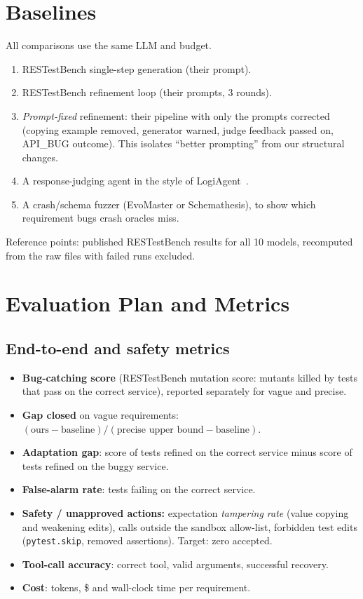 \documentclass[11pt,a4paper]{article}
\begin{document}
\section{Baselines}
All comparisons use the same LLM and budget.
\begin{enumerate}[label=B\arabic*.]
  \item RESTestBench single-step generation (their prompt).
  \item RESTestBench refinement loop (their prompts, 3 rounds).
  \item \emph{Prompt-fixed} refinement: their pipeline with only the prompts corrected (copying example removed, generator warned, judge feedback passed on, \textsc{API\_BUG} outcome). This isolates ``better prompting'' from our structural changes.
  \item A response-judging agent in the style of LogiAgent~\cite{logiagent}.
  \item A crash/schema fuzzer (EvoMaster or Schemathesis), to show which requirement bugs crash oracles miss.
\end{enumerate}
Reference points: published RESTestBench results for all 10 models, recomputed from the raw files with failed runs excluded.

\section{Evaluation Plan and Metrics}
\subsection{End-to-end and safety metrics}
\begin{itemize}
  \item \textbf{Bug-catching score} (RESTestBench mutation score: mutants killed by tests that pass on the correct service), reported separately for vague and precise.
  \item \textbf{Gap closed} on vague requirements: $(\text{ours} - \text{baseline}) / (\text{precise upper bound} - \text{baseline})$.
  \item \textbf{Adaptation gap}: score of tests refined on the correct service minus score of tests refined on the buggy service.
  \item \textbf{False-alarm rate}: tests failing on the correct service.
  \item \textbf{Safety / unapproved actions:} expectation \emph{tampering rate} (value copying and weakening edits), calls outside the sandbox allow-list, forbidden test edits (\texttt{pytest.skip}, removed assertions). Target: zero accepted.
  \item \textbf{Tool-call accuracy}: correct tool, valid arguments, successful recovery.
  \item \textbf{Cost}: tokens, \$ and wall-clock time per requirement.
\end{itemize}
\end{document}
